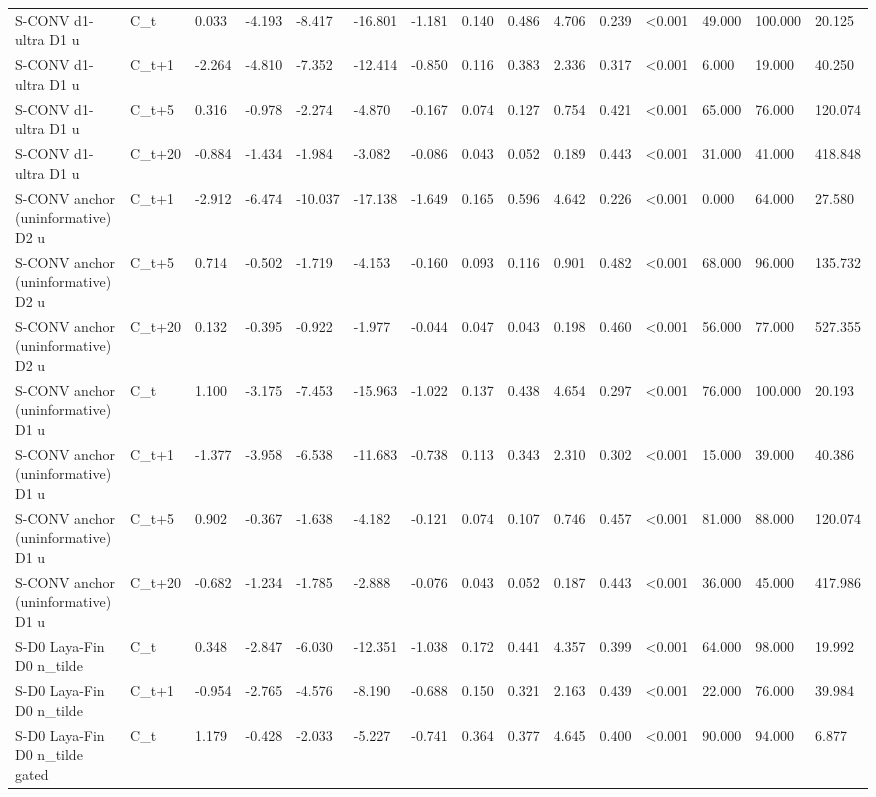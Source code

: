 \begin{tabular}{lllllllllllllll}
S-CONV d1-ultra D1 u & C\_t & 0.033 & -4.193 & -8.417 & -16.801 & -1.181 & 0.140 & 0.486 & 4.706 & 0.239 & <0.001 & 49.000 & 100.000 & 20.125 \\
S-CONV d1-ultra D1 u & C\_t+1 & -2.264 & -4.810 & -7.352 & -12.414 & -0.850 & 0.116 & 0.383 & 2.336 & 0.317 & <0.001 & 6.000 & 19.000 & 40.250 \\
S-CONV d1-ultra D1 u & C\_t+5 & 0.316 & -0.978 & -2.274 & -4.870 & -0.167 & 0.074 & 0.127 & 0.754 & 0.421 & <0.001 & 65.000 & 76.000 & 120.074 \\
S-CONV d1-ultra D1 u & C\_t+20 & -0.884 & -1.434 & -1.984 & -3.082 & -0.086 & 0.043 & 0.052 & 0.189 & 0.443 & <0.001 & 31.000 & 41.000 & 418.848 \\
S-CONV anchor (uninformative) D2 u & C\_t+1 & -2.912 & -6.474 & -10.037 & -17.138 & -1.649 & 0.165 & 0.596 & 4.642 & 0.226 & <0.001 & 0.000 & 64.000 & 27.580 \\
S-CONV anchor (uninformative) D2 u & C\_t+5 & 0.714 & -0.502 & -1.719 & -4.153 & -0.160 & 0.093 & 0.116 & 0.901 & 0.482 & <0.001 & 68.000 & 96.000 & 135.732 \\
S-CONV anchor (uninformative) D2 u & C\_t+20 & 0.132 & -0.395 & -0.922 & -1.977 & -0.044 & 0.047 & 0.043 & 0.198 & 0.460 & <0.001 & 56.000 & 77.000 & 527.355 \\
S-CONV anchor (uninformative) D1 u & C\_t & 1.100 & -3.175 & -7.453 & -15.963 & -1.022 & 0.137 & 0.438 & 4.654 & 0.297 & <0.001 & 76.000 & 100.000 & 20.193 \\
S-CONV anchor (uninformative) D1 u & C\_t+1 & -1.377 & -3.958 & -6.538 & -11.683 & -0.738 & 0.113 & 0.343 & 2.310 & 0.302 & <0.001 & 15.000 & 39.000 & 40.386 \\
S-CONV anchor (uninformative) D1 u & C\_t+5 & 0.902 & -0.367 & -1.638 & -4.182 & -0.121 & 0.074 & 0.107 & 0.746 & 0.457 & <0.001 & 81.000 & 88.000 & 120.074 \\
S-CONV anchor (uninformative) D1 u & C\_t+20 & -0.682 & -1.234 & -1.785 & -2.888 & -0.076 & 0.043 & 0.052 & 0.187 & 0.443 & <0.001 & 36.000 & 45.000 & 417.986 \\
S-D0 Laya-Fin D0 n\_tilde & C\_t & 0.348 & -2.847 & -6.030 & -12.351 & -1.038 & 0.172 & 0.441 & 4.357 & 0.399 & <0.001 & 64.000 & 98.000 & 19.992 \\
S-D0 Laya-Fin D0 n\_tilde & C\_t+1 & -0.954 & -2.765 & -4.576 & -8.190 & -0.688 & 0.150 & 0.321 & 2.163 & 0.439 & <0.001 & 22.000 & 76.000 & 39.984 \\
S-D0 Laya-Fin D0 n\_tilde gated & C\_t & 1.179 & -0.428 & -2.033 & -5.227 & -0.741 & 0.364 & 0.377 & 4.645 & 0.400 & <0.001 & 90.000 & 94.000 & 6.877 \\

\end{tabular}
